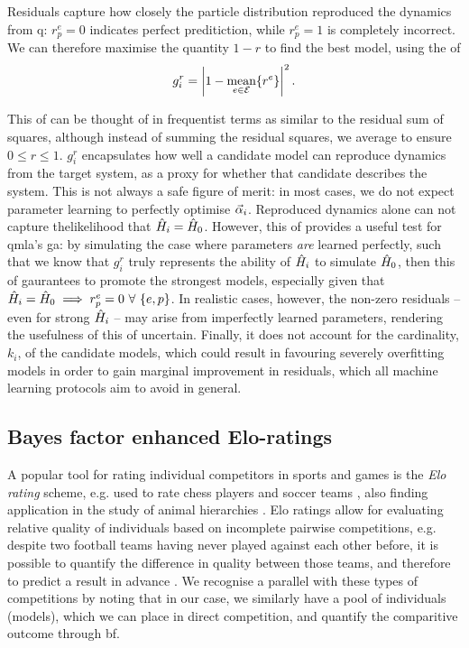 Residuals capture how closely the particle distribution reproduced the dynamics from \gls{q}:
    $r^{e}_{p} = 0$ indicates perfect preditiction, while $r^e_p=1$ is completely incorrect. 
We can therefore maximise the quantity $1-r$ to find    the best model, 
    using the \gls{of}
\begin{equation}
    \label{eqn:residual_fitness}
    g^r_i = \left| 1 - \underset{e \in { \mathcal{E} }}{\text{mean}}\{ {r^e} \}\right|^2.
\end{equation}
\par     
This \gls{of} can be thought of in frequentist terms 
    as similar to the residual sum of squares,
    although instead of summing the residual squares, we average to ensure $0 \leq r \leq 1$. 
$g_i^r$ encapsulates how well a candidate model can reproduce dynamics 
    from the target system, as a proxy for whether that candidate describes the system. 
This is not always a safe figure of merit: 
    in most cases, we do not expect parameter learning to perfectly optimise $\vec{\alpha}_i$. 
Reproduced dynamics alone can not capture the\gls{likelihood} that $\hat{H}_i=\hat{H}_0$. 
However, this \gls{of} provides a useful test for \gls{qmla}'s \gls{ga}:
    by simulating the case where parameters \emph{are} learned perfectly, 
    such that we know that $g_i^r$ truly represents the ability of $\hat{H}_i$ to 
    simulate $\hat{H}_0$, then this \gls{of} gaurantees to promote  the strongest models,
    especially given that $\hat{H}_i=\hat{H}_0 \implies r_p^e=0 \ \forall \ \{e, p\}$. 
In realistic cases, however, the non-zero residuals -- even for 
    strong $\hat{H}_i$ -- may arise from imperfectly learned parameters,
    rendering the usefulness of this \gls{of} uncertain. 
Finally, it does not account for the cardinality, $k_i$, of the candidate models, 
    which could result in favouring severely overfitting models in order to gain marginal improvement 
    in residuals, which all machine learning protocols aim to avoid in general.

\subsection{Bayes factor enhanced Elo-ratings}\label{sec:elo}
A popular tool for rating individual competitors in sports and games is the \emph{Elo rating} scheme, 
    e.g. used to rate chess players and soccer teams \cite{elo1978rating, fifa_elo}, 
    also finding application in the study of animal hierarchies \cite{neumann2011assessing}. 
Elo ratings allow for evaluating relative quality of individuals 
    based on incomplete pairwise competitions, 
    e.g. despite two football teams having never played against each other before, 
    it is possible to quantify the difference in quality between those teams, 
    and therefore to predict a result in advance \cite{hvattum2010using}. 
We recognise a parallel with these types of competitions by noting that
    in our case, we similarly have a pool of individuals (models), 
    which we can place in direct competition, and quantify the comparitive outcome through \gls{bf}. 

